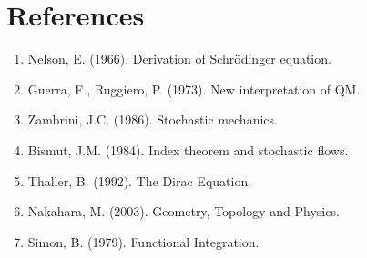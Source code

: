 \documentclass[11pt]{article}
\begin{document}
\section*{References}

\begin{enumerate}
\item Nelson, E. (1966). Derivation of Schr\"odinger equation.
\item Guerra, F., Ruggiero, P. (1973). New interpretation of QM.
\item Zambrini, J.C. (1986). Stochastic mechanics.
\item Bismut, J.M. (1984). Index theorem and stochastic flows.
\item Thaller, B. (1992). The Dirac Equation.
\item Nakahara, M. (2003). Geometry, Topology and Physics.
\item Simon, B. (1979). Functional Integration.
\end{enumerate}
\end{document}

